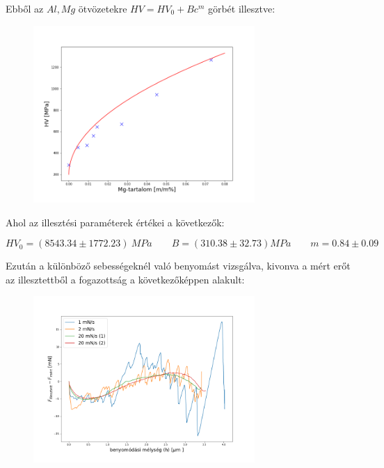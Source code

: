 \documentclass[a4paper,12pt]{article}
\begin{document}
\par Ebből az $Al, Mg$ ötvözetekre $HV = HV_{0} + Bc^{m}$ görbét illesztve:

\begin{figure}[H]
\centering
\includegraphics[width=0.75\textwidth]{./adatok/HV_illeszt.png}
\end{figure}

\par Ahol az illesztési paraméterek értékei a következők:

\begin{equation*}
 HV_0= (8543.34\pm1772.23)~MPa \quad \quad
 B = (310.38\pm32.73)MPa \quad \quad
 m = 0.84\pm0.09
\end{equation*}

\par Ezután a különböző sebességeknél való benyomást vizsgálva, kivonva a mért erőt az illesztettből a fogazottság a következőképpen alakult:

\begin{figure}[H]
\centering
\includegraphics[width=0.75\textwidth]{./adatok/feladat3.png}
\end{figure}
\end{document}
